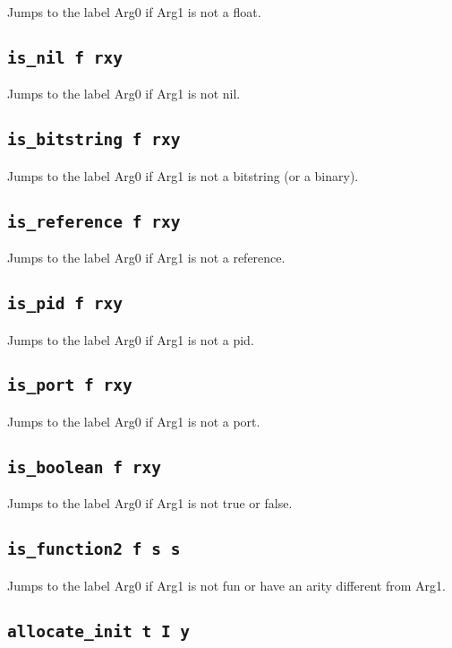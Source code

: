 \documentclass{article}
\newcommand{\iop}[1]{\texttt{#1}}
\begin{document}
Jumps to the label Arg0 if Arg1 is not a float.

\subsection*{\iop{is\_nil f rxy}}

Jumps to the label Arg0 if Arg1 is not nil.

\subsection*{\iop{is\_bitstring f rxy}}

Jumps to the label Arg0 if Arg1 is not a bitstring (or a binary).

\subsection*{\iop{is\_reference f rxy}}

Jumps to the label Arg0 if Arg1 is not a reference.

\subsection*{\iop{is\_pid f rxy}}

Jumps to the label Arg0 if Arg1 is not a pid.

\subsection*{\iop{is\_port f rxy}}

Jumps to the label Arg0 if Arg1 is not a port.

\subsection*{\iop{is\_boolean f rxy}}

Jumps to the label Arg0 if Arg1 is not true or false.

\subsection*{\iop{is\_function2 f s s}}

Jumps to the label Arg0 if Arg1 is not fun or have an arity different from Arg1.

\subsection*{\iop{allocate\_init t I y}}
\end{document}

